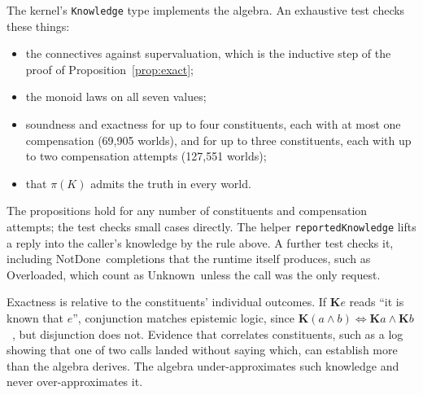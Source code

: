 \documentclass[11pt]{article}
\theoremstyle{definition}
\theoremstyle{plain}
\newcommand{\NotDone}{\textsf{NotDone}}
\newcommand{\Unknown}{\textsf{Unknown}}
\begin{document}
The kernel's \texttt{Knowledge} type implements the algebra. An exhaustive test checks these things:
\begin{itemize}[nosep]
  \item the connectives against supervaluation, which is the inductive step of the proof of Proposition~\ref{prop:exact};
  \item the monoid laws on all seven values;
  \item soundness and exactness for up to four constituents, each with at most one compensation (69{,}905 worlds), and for up to three constituents, each with up to two compensation attempts (127{,}551 worlds);
  \item that $\pi(K)$ admits the truth in every world.
\end{itemize}
The propositions hold for any number of constituents and compensation attempts; the test checks small cases directly. The helper \texttt{reportedKnowledge} lifts a reply into the caller's knowledge by the rule above. A further test checks it, including \NotDone\ completions that the runtime itself produces, such as \textsf{Overloaded}, which count as \Unknown\ unless the call was the only request.

Exactness is relative to the constituents' individual outcomes. If $\mathbf{K}e$ reads ``it is known that $e$'', conjunction matches epistemic logic, since $\mathbf{K}(a\wedge b) \Leftrightarrow \mathbf{K}a \wedge \mathbf{K}b$~\citep{HalpernMoses1990}, but disjunction does not. Evidence that correlates constituents, such as a log showing that one of two calls landed without saying which, can establish more than the algebra derives. The algebra under-approximates such knowledge and never over-approximates it.
\end{document}
